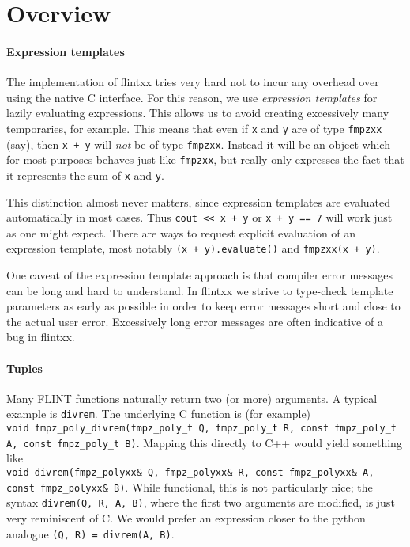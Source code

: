 \documentclass[a4paper,10pt]{book}
\newcommand{\code}{\lstinline}
\begin{document}
{{\section{Overview}

\paragraph{Expression templates}
The implementation of flintxx tries very hard not to incur any overhead over
using the native C interface. For this reason, we use \emph{expression
templates} for lazily evaluating expressions. This allows us to avoid creating
excessively many temporaries, for example. This means that even if \code{x} and
\code{y} are of type \code{fmpzxx} (say), then \code{x + y} will \emph{not} be
of type \code{fmpzxx}. Instead it will be an object which for most purposes
behaves just like \code{fmpzxx}, but really only expresses the fact that it
represents the sum of \code{x} and \code{y}.

This distinction almost never matters, since expression templates are evaluated
automatically in most cases. Thus \code{cout << x + y} or \code{x + y == 7} will
work just as one might expect. There are ways to request explicit evaluation of
an expression template, most notably \code{(x + y).evaluate()} and
\code{fmpzxx(x + y)}.

One caveat of the expression template approach is that compiler error messages
can be long and hard to understand.
In flintxx we strive to type-check template parameters as early as possible in
order to keep error messages short and close to the actual user error.
Excessively long error messages are often indicative of a bug in flintxx.

\paragraph{Tuples}

Many FLINT functions naturally return two (or more) arguments. A typical example
is \code{divrem}. The underlying C function is (for example)\\
\code{void fmpz_poly_divrem(fmpz_poly_t Q, fmpz_poly_t R, const fmpz_poly_t A, const fmpz_poly_t B)}.
Mapping this directly to C++ would yield something like\\
\code{void divrem(fmpz_polyxx& Q, fmpz_polyxx& R, const fmpz_polyxx& A, const fmpz_polyxx& B)}.
While functional, this is not particularly nice; the syntax
\code{divrem(Q, R, A, B)}, where the first two arguments are modified, is just
very reminiscent of C. We would prefer an expression closer to the
python analogue \code{(Q, R) = divrem(A, B)}.

}}
\end{document}
